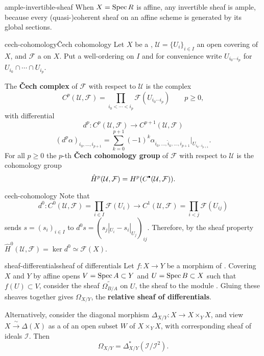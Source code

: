 \begin{example}{ample-invertible-sheaf}
    When $X = \operatorname{Spec} R$ is affine, any invertible sheaf is ample, because every (quasi-)coherent sheaf on an affine scheme is generated by its global sections.
\end{example}

\begin{topic}{cech-cohomology}{Čech cohomology}
    Let $X$ be a , $\mathcal{U} = \{ U_i \}_{i \in I}$ an open covering of $X$, and $\mathcal{F}$ a  on $X$. Put a well-ordering on $I$ and for convenience write $U_{i_0 \cdots i_p}$ for $U_{i_0} \cap \cdots \cap U_{i_p}$.
    
    The \textbf{Čech complex} of $\mathcal{F}$ with respect to $\mathcal{U}$ is the complex
    \[ C^p(\mathcal{U}, \mathcal{F}) = \prod_{i_0 < \cdots < i_p} \mathcal{F}(U_{i_0 \cdots i_p}) \qquad p \ge 0 , \]
    with differential
    \[ d^p : C^p(\mathcal{U}, \mathcal{F}) \to C^{p + 1}(\mathcal{U}, \mathcal{F}) \]
    \[ (d^p \alpha)_{i_0 , \ldots , i_{p + 1}} = \sum_{k = 0}^{p + 1} (-1)^k \alpha_{i_0 , \ldots , \hat{i}_k, \ldots, i_{p + 1}} | _{U_{i_0 \cdots i_{p + 1}}} . \]
    For all $p \ge 0$ the $p$-th \textbf{Čech cohomology group} of $\mathcal{F}$ with respect to $\mathcal{U}$ is the cohomology group
    \[ \hat{H}^p(\mathcal{U}, \mathcal{F}) = H^p(C^\bdot(\mathcal{U}, \mathcal{F})) . \]
\end{topic}

\begin{example}{cech-cohomology}
    Note that 
    \[ d^0 : C^0(\mathcal{U}, \mathcal{F}) = \prod_{i \in I} \mathcal{F}(U_i) \to C^1(\mathcal{U}, \mathcal{F}) = \prod_{i < j} \mathcal{F}(U_{ij}) \]
    sends $s = (s_i)_{i \in I}$ to $d^0 s = \left(s_j|_{U_i} - s_i|_{U_j}\right)_{ij}$. Therefore, by the sheaf property $\hat{H}^0(\mathcal{U}, \mathcal{F}) = \ker d^0 \simeq \mathcal{F}(X)$.
\end{example}

\begin{topic}{sheaf-differentials}{sheaf of differentials}
    Let $f : X \to Y$ be a morphism of . Covering $X$ and $Y$ by affine opens $V = \operatorname{Spec} A \subset Y$ and $U = \operatorname{Spec} B \subset X$ such that $f(U) \subset V$, consider the sheaf $\widetilde{\Omega_{B/A}}$ on $U$, the sheaf  to the module . Gluing these sheaves together gives $\Omega_{X/Y}$, the \textbf{relative sheaf of differentials}.
    
    Alternatively, consider the diagonal morphism $\Delta_{X/Y} : X \to X \times_Y X$, and view $X \xrightarrow{\sim{}} \Delta(X)$ as a  of an open subset $W$ of $X \times_Y X$, with corresponding sheaf of ideals $\mathcal{I}$. Then
    \[ \Omega_{X/Y} = \Delta_{X/Y}^*(\mathcal{I}/\mathcal{I}^2) . \]
\end{topic}

